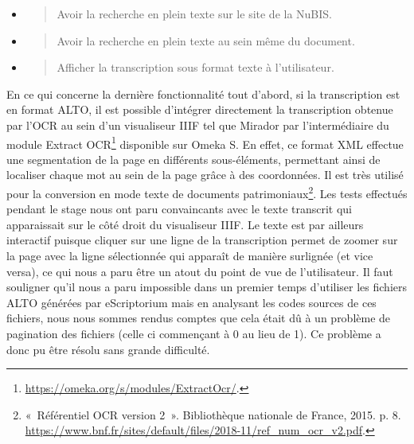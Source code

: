 \documentclass[a4paper,12pt,twoside]{book}
\begin{document}
\begin{itemize}
	\item
	\begin{quote}
		Avoir la recherche en plein texte sur le site de la NuBIS.
	\end{quote}
	\item
	\begin{quote}
		Avoir la recherche en plein texte au sein même du document.
	\end{quote}
	\item
	\begin{quote}
		Afficher la transcription sous format texte à l'utilisateur. \\
	\end{quote}
\end{itemize}

En ce qui concerne la dernière fonctionnalité tout d'abord, si la
transcription est en format ALTO, il est possible d'intégrer directement
la transcription obtenue par l'OCR au sein d'un visualiseur IIIF tel que
Mirador par l'intermédiaire du module Extract OCR\footnote{\url{https://omeka.org/s/modules/ExtractOcr/}.}
disponible sur Omeka S. En effet, ce format XML effectue une
segmentation de la page en différents sous-éléments, permettant ainsi de
localiser chaque mot au sein de la page grâce à des coordonnées. Il est
très utilisé pour la conversion en mode texte de documents
patrimoniaux\footnote{«~Référentiel OCR version 2~». Bibliothèque
	nationale de France, 2015. p. 8.
	\url{https://www.bnf.fr/sites/default/files/2018-11/ref_num_ocr_v2.pdf}.}. 
Les tests effectués pendant le stage nous ont paru convaincants avec le
texte transcrit qui apparaissait sur le côté droit du visualiseur IIIF.
Le texte est par ailleurs interactif puisque cliquer sur une ligne de la
transcription permet de zoomer sur la page avec la ligne sélectionnée
qui apparaît de manière surlignée (et vice versa), ce qui nous a paru
être un atout du point de vue de l'utilisateur. Il faut souligner qu'il nous a paru impossible dans un premier temps d'utiliser les fichiers ALTO générées par eScriptorium mais en analysant les codes sources de ces fichiers, nous nous sommes rendus comptes que cela était dû à un problème de pagination des fichiers (celle ci commençant à 0 au lieu de 1). Ce problème a donc pu être résolu sans grande difficulté. \\
\end{document}
